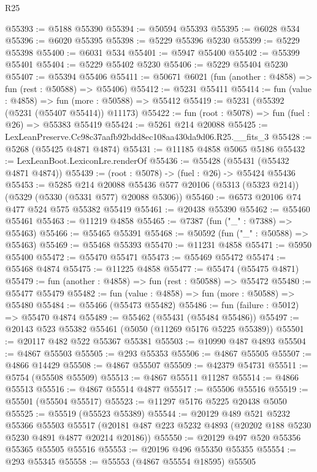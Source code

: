 \begin{lexlean}{R25}
\begin{coremodule}
@55393 := @5188 @55390
@55394 := @50594 @55393
@55395 := @6028 @534
@55396 := @6020 @55395
@55398 := @5229 @55396 @5230
@55399 := @5229 @55398
@55400 := @6031 @534
@55401 := @5947 @55400
@55402 := @55399 @55401
@55404 := @5229 @55402 @5230
@55406 := @5229 @55404 @5230
@55407 := @55394 @55406
@55411 := @50671 @6021 (fun (another : @4858) => fun (rest : @50588) => @55406)
@55412 := @5231 @55411
@55414 := fun (value : @4858) => fun (more : @50588) => @55412
@55419 := @5231 (@55392 (@5231 (@55407 @55414)) @11173)
@55422 := fun (root : @5078) => fun (fuel : @26) => @55383 @55419
@55424 := @5261 @214 @20088
@55425 := LexLeanPreserve.Cc98c37aafb92bdd8ec108aa430da9d06.R25.__fits_3
@55428 := @5268 (@55425 @4871 @4874)
@55431 := @11185 @4858 @5065 @5186
@55432 := LexLeanBoot.LexiconLre.renderOf
@55436 := @55428 (@55431 (@55432 @4871 @4874))
@55439 := (root : @5078) -> (fuel : @26) -> @55424 @55436
@55453 := @5285
    @214
    @20088
    @55436
    @577
    @20106
    (@5313 (@5323 @214))
    (@5329 (@5330 (@5331 @577) @20088 @5306))
@55460 := @6573 @20106 @74 @477 @524 @575 @55382 @55419
@55461 := @20438 @55390
@55462 := @55460 @55461
@55463 := @11219 @4858
@55465 := @7387 (fun ("_" : @7388) => @55463)
@55466 := @55465 @55391
@55468 := @50592 (fun ("_" : @50588) => @55463)
@55469 := @55468 @55393
@55470 := @11231 @4858
@55471 := @5950 @55400
@55472 := @55470 @55471
@55473 := @55469 @55472
@55474 := @55468 @4874
@55475 := @11225 @4858
@55477 := @55474 (@55475 @4871)
@55479 := fun (another : @4858) => fun (rest : @50588) => @55472
@55480 := @55477 @55479
@55482 := fun (value : @4858) => fun (more : @50588) => @55480
@55484 := @55466 (@55473 @55482)
@55486 := fun (failure : @5012) => @55470 @4874
@55489 := @55462 (@55431 (@55484 @55486))
@55497 := @20143 @523 @55382 @55461 (@5050 (@11269 @5176 @5225 @55389))
@55501 := @20117 @482 @522 @55367 @55381
@55503 := @10990 @487 @4893
@55504 := @4867 @55503
@55505 := @293 @55353
@55506 := @4867 @55505
@55507 := @4866 @14429
@55508 := @4867 @55507
@55509 := @42379 @54731
@55511 := @5754 (@55508 @55509)
@55513 := @4867 @55511 @11287
@55514 := @4866 @55513
@55516 := @4867 @55514 @4877
@55517 := @55506 @55516
@55519 := @55501 (@55504 @55517)
@55523 := @11297 @5176 @5225 @20438 @5050
@55525 := @55519 (@55523 @55389)
@55544 := @20129
    @489
    @521
    @5232
    @55366
    @55503
    @55517
    (@20181 @487 @223 @5232 @4893 (@20202 @188 @5230 @5230 @4891 @4877 @20214 @20186))
@55550 := @20129 @497 @520 @55356 @55365 @55505 @55516
@55553 := @20196 @496 @55350 @55355
@55554 := @293 @55345
@55558 := @55553 (@4867 @55554 @18595) @55505

\end{coremodule}
\end{lexlean}
